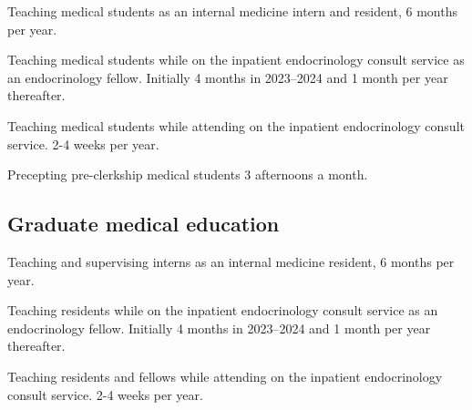 \documentclass{komacv}
\begin{document}
{Teaching medical students as an internal medicine intern and resident, 6 months per year.}

{Teaching medical students while on the inpatient endocrinology consult service as an endocrinology fellow. Initially 4 months in 2023--2024 and 1 month per year thereafter.}

{Teaching medical students while attending on the inpatient endocrinology consult service. 2-4 weeks per year.}

{Precepting pre-clerkship medical students 3 afternoons a month.}

\subsection{Graduate medical education}




{Teaching and supervising interns as an internal medicine resident, 6 months per year.}

{Teaching residents while on the inpatient endocrinology consult service as an endocrinology fellow. Initially 4 months in 2023--2024 and 1 month per year thereafter.}

{Teaching residents and fellows while attending on the inpatient endocrinology consult service. 2-4 weeks per year.}




\end{document}

